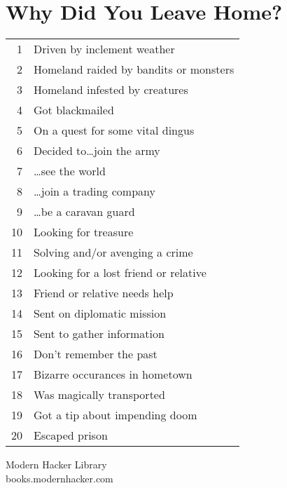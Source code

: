 \documentclass[12pt]{article}
\begin{document}
\section{Why Did You Leave Home?}
\begin{tabular}{r|l}
1 & Driven by inclement weather\\
2 & Homeland raided by bandits or monsters\\
3 & Homeland infested by creatures\\
4 & Got blackmailed\\
5 & On a quest for some vital dingus\\
6 & Decided to\ldots  join the army\\
7 & \hspace{.7in} \ldots see the world\\
8 & \hspace{.7in} \ldots join a trading company\\
9 & \hspace{.7in} \ldots be a caravan guard\\
10 & Looking for treasure\\
11 & Solving and/or avenging a crime\\
12 & Looking for a lost friend or relative\\
13 & Friend or relative needs help\\
14 & Sent on diplomatic mission\\
15 & Sent to gather information\\
16 & Don't remember the past\\
17 & Bizarre occurances in hometown\\
18 & Was magically transported\\
19 & Got a tip about impending doom\\
20 & Escaped prison\\
\end{tabular}




\vfill
\begin{center}
{\selectfont 
Modern Hacker Library\\books.modernhacker.com}
\end{center}
\end{document}
